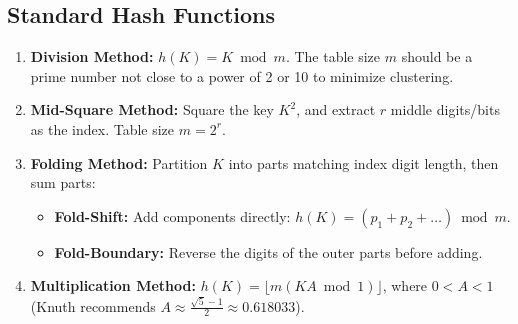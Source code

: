 \documentclass[12pt,a4paper]{article}
\begin{document}
\subsection{Standard Hash Functions}
\begin{enumerate}[leftmargin=*, itemsep=3pt]
  \item \textbf{Division Method:} $h(K) = K \bmod m$. The table size $m$ should be a prime number not close to a power of 2 or 10 to minimize clustering.
  \item \textbf{Mid-Square Method:} Square the key $K^2$, and extract $r$ middle digits/bits as the index. Table size $m = 2^r$.
  \item \textbf{Folding Method:} Partition $K$ into parts matching index digit length, then sum parts:
  \begin{itemize}[leftmargin=*, nosep]
    \item \textbf{Fold-Shift:} Add components directly: $h(K) = (p_1 + p_2 + \dots) \bmod m$.
    \item \textbf{Fold-Boundary:} Reverse the digits of the outer parts before adding.
  \end{itemize}
  \item \textbf{Multiplication Method:} $h(K) = \lfloor m (K A \bmod 1) \rfloor$, where $0 < A < 1$ (Knuth recommends $A \approx \frac{\sqrt{5}-1}{2} \approx 0.618033$).
\end{enumerate}
\end{document}
